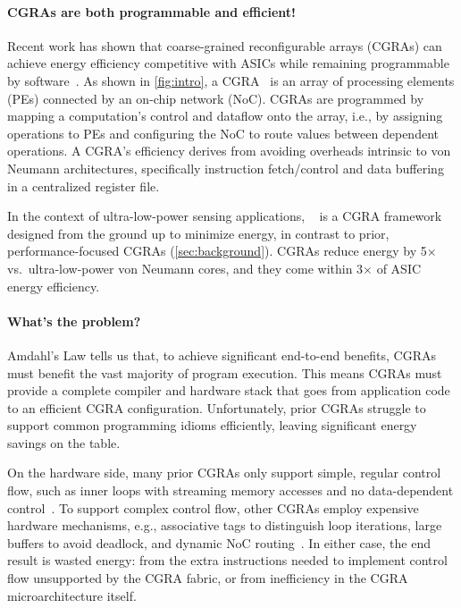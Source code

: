 \paragraph{CGRAs are both programmable and efficient!}
%
Recent work has shown that coarse-grained reconfigurable
arrays (CGRAs) can achieve energy efficiency competitive with ASICs
while remaining programmable by software~\cite{snafu,nowatzki2017domain,weng2020dsagen}.
%
As shown in \autoref{fig:intro},
a CGRA~\cite{remarc,adres,matrix,dyser,revamp,opencgra,cgrame,wave,nguyen2021fifer,morphosys,mozart,ppa,fpca,plasticine,dadu2019towards,parashar2013triggered,capstan,nowatzki:isca17:stream-dataflow,goldstein2000piperench,trips,weng2020dsagen,weng2020hybrid,voitsechov2014single,mishra2006tartan,tan2018stitch,karunaratne2017hycube,voitsechov2018inter,evx} is an array of processing elements
(PEs) connected by an on-chip network (NoC).
%
CGRAs are programmed by mapping a computation's control and dataflow
onto the array, i.e., by assigning operations to PEs and configuring
the NoC to route values between dependent operations.
%
A CGRA's efficiency derives from avoiding overheads intrinsic to von
Neumann architectures, specifically instruction fetch/control and data
buffering in a centralized register file.

In the context of ultra-low-power sensing applications,
\snafu~\cite{snafu} is a CGRA framework designed from
the ground up to minimize energy, in contrast to prior,
performance-focused CGRAs (\autoref{sec:background}).
%
\snafu CGRAs reduce energy by 5$\times$ vs.\ ultra-low-power von Neumann
cores, and they come within 3$\times$ of ASIC energy efficiency.

\figRipTideIntro

\paragraph{What's the problem?}
%
Amdahl's Law tells us that, to achieve significant end-to-end benefits,
CGRAs must benefit the vast majority of program execution.
%
This means CGRAs must provide a complete compiler and hardware stack
that goes from application code to an efficient CGRA configuration.
%
Unfortunately, prior CGRAs struggle to support common programming
idioms efficiently, leaving significant energy savings on the table.

On the hardware side,
%
many prior CGRAs only support simple, regular control flow,
such as inner loops with streaming memory accesses
and no data-dependent control~\cite{plasticine,nowatzki:isca17:stream-dataflow,snafu}.
%
To support complex control flow, other CGRAs employ expensive hardware mechanisms, e.g.,
associative tags to distinguish loop iterations,
large buffers to avoid deadlock,
and dynamic NoC routing~\cite{monsoon,ttda,swanson2003wavescalar,voitsechov2014single}.
%
In either case, the end result is wasted energy:
%
from the extra instructions needed to implement control flow unsupported
by the CGRA fabric,
%
or from inefficiency in the CGRA microarchitecture itself.

